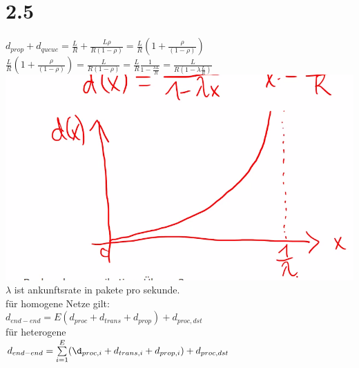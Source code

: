 \documentclass{article}
\begin{document}
	\section{2.5}
	$d_{prop}+d_{queue} = \frac{L}{R}+\frac{L\rho}{R(1-\rho)} =\frac{L}{R}(1+\frac{\rho}{(1-\rho)}) $\\
	$\frac{L}{R}(1+\frac{\rho}{(1-\rho)})=\frac{L}{R(1-\rho)}=\frac{L}{R}\frac{1}{1-\frac{\lambda L}{R}}=\frac{L}{R(1-\lambda\frac{L}{R})}$\\
	\includegraphics[scale=0.25]{warteschlangenplot.png}\\
	$\lambda$ ist ankunftsrate in pakete pro sekunde.\\
	für homogene Netze gilt:\\
	$d_{end-end} = E(d_{proc}+d_{trans}+d_{prop})+d_{proc,dst}$\\
	für heterogene %
	\\
	$d_{end-end} = \sum\limits_{i=1}^E(\d_{proc,i}+d_{trans,i}+d_{prop,i})+d_{proc,dst}$\\
\end{document}
